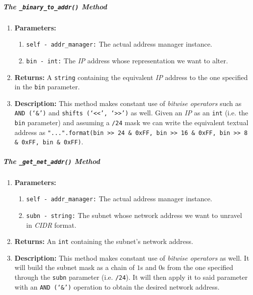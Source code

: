         \subparagraph{The \texttt{\_binary\_to\_addr()} Method}
            \begin{enumerate}
                \item \textbf{Parameters:}
                \begin{enumerate}
                    \item \texttt{self - addr\_manager:} The actual address manager instance.
                    \item \texttt{bin - int:} The \textit{IP} address whose representation we want to alter.
                \end{enumerate}
                \item \textbf{Returns:} A \texttt{string} containing the equivalent \textit{IP} address to the one specified in the \texttt{bin} parameter.
                \item \textbf{Description:} This method makes constant use of \textit{bitwise operators} such as \texttt{AND (`\&')} and \texttt{shifts (`<<', `>>')} as well. Given an \textit{IP} as an \texttt{int} (i.e. the \texttt{bin} parameter) and assuming a \texttt{/24} mask we can write the equivalent textual address as \texttt{"{}.{}.{}.{}".format(bin >> 24 \& 0xFF, bin >> 16 \& 0xFF, bin >> 8 \& 0xFF, bin \& 0xFF)}.
            \end{enumerate}

        \subparagraph{The \texttt{\_get\_net\_addr()} Method}
            \begin{enumerate}
                \item \textbf{Parameters:}
                \begin{enumerate}
                    \item \texttt{self - addr\_manager:} The actual address manager instance.
                    \item \texttt{subn - string:} The subnet whose network address we want to unravel in \textit{CIDR} format.
                \end{enumerate}
                \item \textbf{Returns:} An \texttt{int} containing the subnet's network address.
                \item \textbf{Description:} This method makes constant use of \textit{bitwise operators} as well. It will build the subnet mask as a chain of $1$s and $0$s from the one specified through the \texttt{subn} parameter (i.e. \texttt{/24}). It will then apply it to said parameter with an \texttt{AND (`\&')} operation to obtain the desired network address.
            \end{enumerate}

